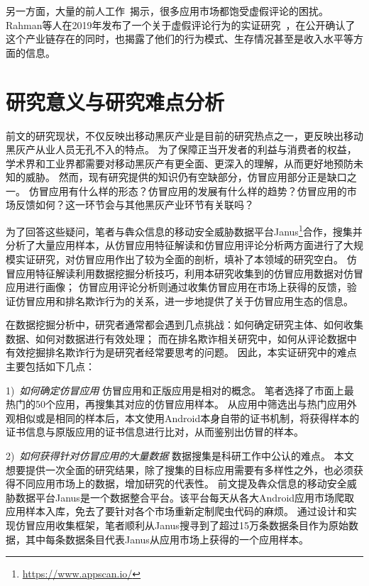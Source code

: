 另一方面，大量的前人工作~\cite{hernandez2019the, xie2014grouptie, zhu2014discovery, hu2019want, chen2017toward, xie2016you, hooi2016fraudar}揭示，很多应用市场都饱受虚假评论的困扰。
Rahman等人在2019年发布了一个关于虚假评论行为的实证研究~\cite{rahman2019art}，在公开确认了这个产业链存在的同时，也揭露了他们的行为模式、生存情况甚至是收入水平等方面的信息。


\section{研究意义与研究难点分析}

前文的研究现状，不仅反映出移动黑灰产业是目前的研究热点之一，更反映出移动黑灰产从业人员无孔不入的特点。
为了保障正当开发者的利益与消费者的权益，学术界和工业界都需要对移动黑灰产有更全面、更深入的理解，从而更好地预防未知的威胁。
然而，现有研究提供的知识仍有空缺部分，仿冒应用部分正是缺口之一。
仿冒应用有什么样的形态？仿冒应用的发展有什么样的趋势？仿冒应用的市场反馈如何？这一环节会与其他黑灰产业环节有关联吗？

为了回答这些疑问，笔者与犇众信息的移动安全威胁数据平台Janus\footnote{\url{https://www.appscan.io/}}合作，搜集并分析了大量应用样本，从仿冒应用特征解读和仿冒应用评论分析两方面进行了大规模实证研究，对仿冒应用作出了较为全面的剖析，填补了本领域的研究空白。
仿冒应用特征解读利用数据挖掘分析技巧，利用本研究收集到的仿冒应用数据对仿冒应用进行画像；
仿冒应用评论分析则通过收集仿冒应用在市场上获得的反馈，验证仿冒应用和排名欺诈行为的关系，进一步地提供了关于仿冒应用生态的信息。

在数据挖掘分析中，研究者通常都会遇到几点挑战：如何确定研究主体、如何收集数据、如何对数据进行有效处理；
而在排名欺诈相关研究中，如何从评论数据中有效挖掘排名欺诈行为是研究者经常要思考的问题。
因此，本实证研究中的难点主要包括如下几点：

1)\	\emph{如何确定仿冒应用} \quad
仿冒应用和正版应用是相对的概念。
笔者选择了市面上最热门的50个应用，再搜集其对应的仿冒应用样本。
从应用中筛选出与热门应用外观相似或是相同的样本后，本文使用Android本身自带的证书机制，将获得样本的证书信息与原版应用的证书信息进行比对，从而鉴别出仿冒的样本。

2)\	\emph{如何获得针对仿冒应用的大量数据} \quad
数据搜集是科研工作中公认的难点。
本文想要提供一次全面的研究结果，除了搜集的目标应用需要有多样性之外，也必须获得不同应用市场上的数据，增加研究的代表性。
前文提及犇众信息的移动安全威胁数据平台Janus是一个数据整合平台。该平台每天从各大Android应用市场爬取应用样本入库，免去了要针对各个市场重新定制爬虫代码的麻烦。
通过设计和实现仿冒应用收集框架\mytool，笔者顺利从Janus搜寻到了超过15万条数据条目作为原始数据，其中每条数据条目代表Janus从应用市场上获得的一个应用样本。

